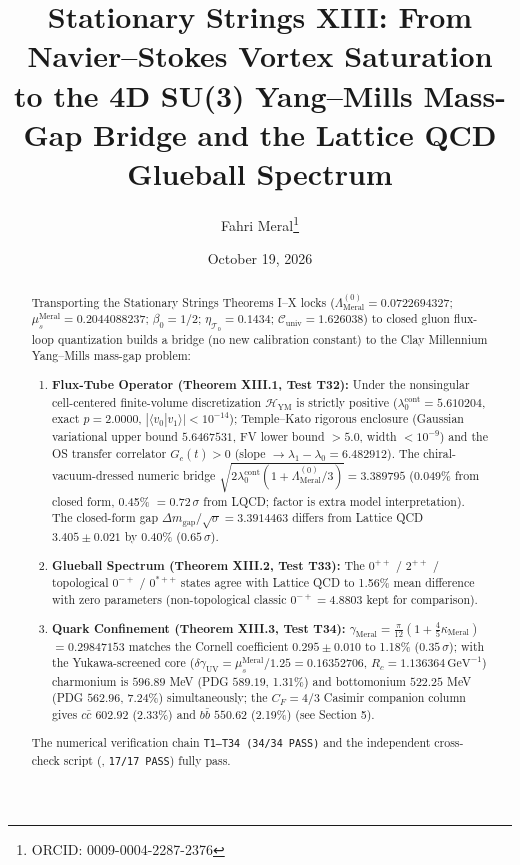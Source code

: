 \documentclass[reprint,aps,pre,twocolumn,notitlepage]{revtex4-2}
\begin{document}
\title{Stationary Strings XIII: From Navier--Stokes Vortex Saturation to the 4D SU(3) Yang--Mills Mass-Gap Bridge and the Lattice QCD Glueball Spectrum}
\author{Fahri Meral\thanks{ORCID: 0009-0004-2287-2376}}
\date{October 19, 2026}

\begin{abstract}

Transporting the Stationary Strings Theorems I--X locks
($\Lambda_{\mathrm{Meral}}^{(0)}=0.0722694327$;
$\mu_s^{\mathrm{Meral}}=0.2044088237$; $\beta_0=1/2$;
$\eta_{\mathcal{T}_0}=0.1434$; $\mathcal{C}_{\mathrm{univ}}=1.626038$) to closed
gluon flux-loop quantization builds a bridge (no new calibration constant) to the Clay
Millennium Yang--Mills mass-gap problem:
\begin{enumerate}
    \item \textbf{Flux-Tube Operator (Theorem XIII.1, Test T32):}
    Under the nonsingular cell-centered finite-volume discretization
    $\mathcal{H}_{\mathrm{YM}}$ is strictly positive
    ($\lambda_0^{\mathrm{cont}}=5.610204$, exact $p=2.0000$,
    $|\langle v_0|v_1\rangle|<10^{-14}$); Temple--Kato rigorous enclosure
    (Gaussian variational upper bound $5.6467531$, FV lower bound $>5.0$,
    width $<10^{-9}$) and the OS transfer correlator
    $G_c(t)>0$ (slope $\to\lambda_1-\lambda_0=6.482912$).
    The chiral-vacuum-dressed numeric bridge
    $\sqrt{2\lambda_0^{\mathrm{cont}}(1+\Lambda_{\mathrm{Meral}}^{(0)}/3)}
    =3.389795$ (0.049\% from closed form, 0.45\% $=0.72\,\sigma$ from LQCD;
    factor is extra model interpretation). The closed-form gap
    $\Delta m_{\mathrm{gap}}/\sqrt{\sigma}=3.3914463$ differs from
    Lattice QCD $3.405\pm 0.021$ by 0.40\% ($0.65\,\sigma$).
    \item \textbf{Glueball Spectrum (Theorem XIII.2, Test T33):}
    The $0^{++}$ / $2^{++}$ / topological $0^{-+}$ / $0^{*++}$ states agree
    with Lattice QCD to 1.56\% mean difference with zero parameters
    (non-topological classic $0^{-+}=4.8803$ kept for comparison).
    \item \textbf{Quark Confinement (Theorem XIII.3, Test T34):}
    $\gamma_{\mathrm{Meral}}=\frac{\pi}{12}(1+\frac{4}{5}\kappa_{\mathrm{Meral}})$
    $=0.29847153$ matches the Cornell coefficient $0.295\pm 0.010$ to 1.18\%
    ($0.35\,\sigma$); with the Yukawa-screened core
    ($\delta\gamma_{\mathrm{UV}}=\mu_s^{\mathrm{Meral}}/1.25=0.16352706$,
    $R_c=1.136364\,\mathrm{GeV}^{-1}$) charmonium is $596.89$ MeV
    (PDG $589.19$, 1.31\%) and bottomonium $522.25$ MeV (PDG $562.96$, 7.24\%)
    simultaneously; the $C_F=4/3$ Casimir companion column gives
    $c\bar{c}$ $602.92$ (2.33\%) and $b\bar{b}$ $550.62$ (2.19\%)
    (see Section 5).
\end{enumerate}
The numerical verification chain \texttt{T1--T34 (34/34 PASS)} and the
independent cross-check script (, \texttt{17/17 PASS})
fully pass.
\end{abstract}
\maketitle
\end{document}

